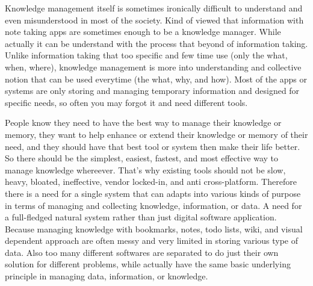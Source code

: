 Knowledge management itself is sometimes ironically difficult to understand and even misunderstood in most of the society.
Kind of viewed that information with note taking apps are sometimes enough to be a knowledge manager.
While actually it can be understand with the process that beyond of information taking.
Unlike information taking that too specific and few time use (only the what, when, where), knowledge management is more into understanding and collective notion that can be used everytime (the what, why, and how).
Most of the apps or systems are only storing and managing temporary information and designed for specific needs, so often you may forgot it and need different tools.

People know they need to have the best way to manage their knowledge or memory, they want to help enhance or extend their knowledge or memory of their need, and they should have that best tool or system then make their life better.
So there should be the simplest, easiest, fastest, and most effective way to manage knowledge whereever.
That's why existing tools should not be slow, heavy, bloated, ineffective, vendor locked-in, and anti cross-platform.
Therefore there is a need for a single system that can adapts into various kinds of purpose in terms of managing and collecting knowledge, information, or data.
A need for a full-fledged natural system rather than just digital software application.
Because managing knowledge with bookmarks, notes, todo lists, wiki, and visual dependent approach are often messy and very limited in storing various type of data.
Also too many different softwares are separated to do just their own solution for different problems, while actually have the same basic underlying principle in managing data, information, or knowledge.

